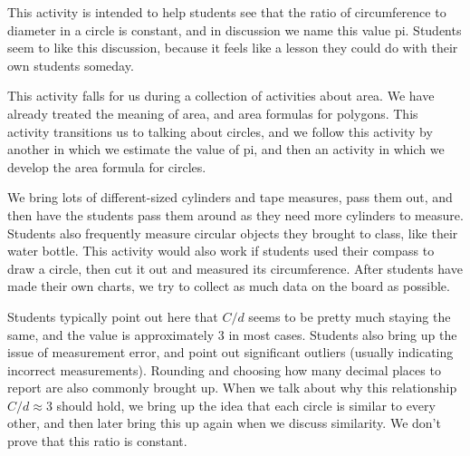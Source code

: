 \documentclass[nooutcomes]{ximera}
\begin{document}
\newpage
\begin{instructorNotes}
This activity is intended to help students see that the ratio of circumference to diameter in a circle is constant, and in discussion we name this value pi.  Students seem to like this discussion, because it feels like a lesson they could do with their own students someday.

This activity falls for us during a collection of activities about area.  We have already treated the meaning of area, and area formulas for polygons.  This activity transitions us to talking about circles, and we follow this activity by another in which we estimate the value of pi, and then an activity in which we develop the area formula for circles.

We bring lots of different-sized cylinders and tape measures, pass them out, and then have the students pass them around as they need more cylinders to measure.  Students also frequently measure circular objects they brought to class, like their water bottle.  This activity would also work if students used their compass to draw a circle, then cut it out and measured its circumference.  After students have made their own charts, we try to collect as much data on the board as possible.

Students typically point out here that $C/d$ seems to be pretty much staying the same, and the value is approximately 3 in most cases.  Students also bring up the issue of measurement error, and point out significant outliers (usually indicating incorrect measurements).  Rounding and choosing how many decimal places to report are also commonly brought up.  When we talk about why this relationship $C/d \approx 3$ should hold, we bring up the idea that each circle is similar to every other, and then later bring this up again when we discuss similarity.  We don't prove that this ratio is constant.




\end{instructorNotes}
\end{document}
